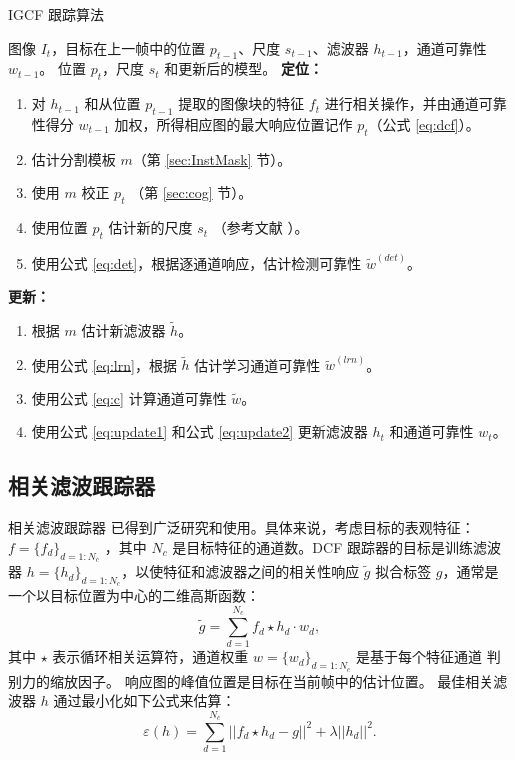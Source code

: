 \begin{algorithm}[t]
\renewcommand{\algorithmicrequire}{\textbf{输入：}}
\renewcommand{\algorithmicensure}{\textbf{输出：}}
  \caption{IGCF 跟踪算法} 
  \begin{algorithmic}
    \Require 图像 $I_t$，目标在上一帧中的位置 $p_{t-1}$、尺度 $s_{t-1}$、滤波器 $h_{t-1}$，通道可靠性 $w_{t-1}$。
    \Ensure 位置 $p_t$，尺度 $s_t$ 和更新后的模型。
  \Statex
  \State \textbf{定位：}
  \begin{enumerate}[leftmargin=0pt,itemindent=1.5em]
    \item 对 $h_{t-1}$ 和从位置 $p_{t-1}$ 提取的图像块的特征 $f_{t}$ 进行相关操作，并由通道可靠性得分 $w_{t-1}$ 加权，所得相应图的最大响应位置记作 $p_t$（公式 \ref{eq:dcf}）。
    \item 估计分割模板 $m$（第 \ref{sec:InstMask} 节）。
    \item 使用 $m$ 校正 $p_t$ （第 \ref{sec:cog} 节）。
    \item 使用位置 $p_t$ 估计新的尺度 $s_t$ （参考文献 \cite{Danelljan2014AccurateSE}）。
    \item 使用公式 \ref{eq:det}，根据逐通道响应，估计检测可靠性 $\tilde{w}^{(det)}$。
  \end{enumerate}
  \State \textbf{更新：}
  \begin{enumerate}[leftmargin=0pt,itemindent=1.5em]
    \item 根据 $m$ 估计新滤波器 $\tilde{h}$。
    \item 使用公式 \ref{eq:lrn}，根据 $\tilde h$ 估计学习通道可靠性 $\tilde{w}^{(lrn)}$。
    \item 使用公式 \ref{eq:c} 计算通道可靠性 $\tilde{w}$。
    \item 使用公式 \ref{eq:update1} 和公式 \ref{eq:update2} 更新滤波器 $h_t$ 和通道可靠性 $w_t$。
  \end{enumerate}
\end{algorithmic}
\end{algorithm}

\subsection{相关滤波跟踪器}
相关滤波跟踪器 \cite{Danelljan2014AccurateSE, henriques2014high-speed, Li2014ASA} 已得到广泛研究和使用。具体来说，考虑目标的表观特征：$f=\{f_d\}_{d=1:N_c}$ ，其中 $N_c$ 是目标特征的通道数。DCF 跟踪器的目标是训练滤波器 $h=\{h_d\}_{d=1:N_c}$，以使特征和滤波器之间的相关性响应 $\tilde{g}$ 拟合标签 $g$，通常是一个以目标位置为中心的二维高斯函数： 
\begin{equation} \label{eq:dcf}
\tilde{g}=\sum_{d=1}^{N_c}f_d \star h_d \cdot w_d,
\end{equation}
其中 $\star$ 表示循环相关运算符，通道权重 $w = \{w_d\}_{d=1:N_c}$ 是基于每个特征通道 \cite{Lukezic2017DiscriminativeCF} 判别力的缩放因子。
响应图的峰值位置是目标在当前帧中的估计位置。
最佳相关滤波器 $h$ 通过最小化如下公式来估算：
\begin{equation}
\varepsilon(h) = \sum_{d=1}^{N_c}||f_d \star h_d - g||^2+\lambda||h_d||^2.
\end{equation}

